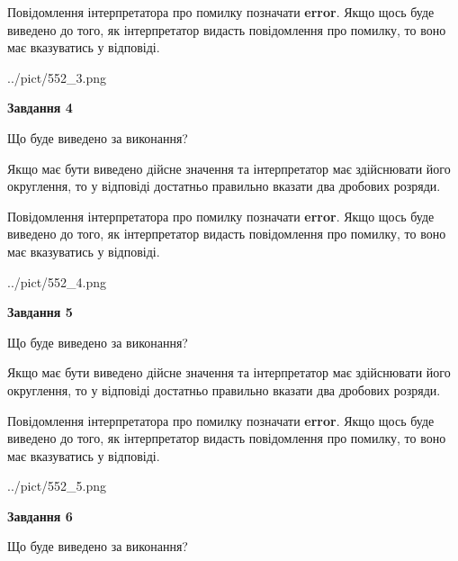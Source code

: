 \documentclass[12pt, ukrainian]{article}
\begin{document}
{\begin {Large}
Повідомлення інтерпретатора про помилку позначати \textbf{error}.
Якщо щось буде виведено до того, як інтерпретатор видасть повідомлення про помилку, 
то воно має вказуватись у відповіді. \par

\begin{center}
	{../pict/552_3.png}
\end{center}
\newpage

{\begin {center}\textbf{Завдання 4}\end {center}}\par
Що буде виведено за виконання? \par

Якщо має бути виведено дійсне значення та інтерпретатор має здійснювати його округлення, 
то у відповіді достатньо правильно вказати два дробових розряди.

Повідомлення інтерпретатора про помилку позначати \textbf{error}.
Якщо щось буде виведено до того, як інтерпретатор видасть повідомлення про помилку, 
то воно має вказуватись у відповіді. \par

\begin{center}
	{../pict/552_4.png}
\end{center}
\newpage

{\begin {center}\textbf{Завдання 5}\end {center}}\par
Що буде виведено за виконання? \par

Якщо має бути виведено дійсне значення та інтерпретатор має здійснювати його округлення, 
то у відповіді достатньо правильно вказати два дробових розряди.

Повідомлення інтерпретатора про помилку позначати \textbf{error}.
Якщо щось буде виведено до того, як інтерпретатор видасть повідомлення про помилку, 
то воно має вказуватись у відповіді. \par

\begin{center}
	{../pict/552_5.png}
\end{center}
\newpage

{\begin {center}\textbf{Завдання 6}\end {center}}\par
Що буде виведено за виконання? \par


\end{Large}}
\end{document}
